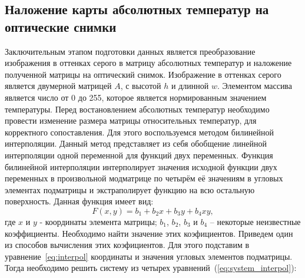 \documentclass[14pt, a4paper]{extreport}
\begin{document}
\subsection[\vspace*{-0.22cm}Наложение карты абсолютных температур на оптические \\ \hspace*{-1.15cm}снимки]{\vspace*{-0.22cm}Наложение карты абсолютных температур на \\ \hspace*{-3.75cm}оптические снимки}	
	Заключительным этапом подготовки данных является преобразование изображения в оттенках серого в матрицу абсолютных температур и наложение полученной матрицы на оптический снимок. Изображение в оттенках серого является двумерной матрицей $A$, с высотой $h$ и длинной $w$. Элементом массива является число от 0 до 255, которое является нормированным значением температуры.
	Перед востановлением абсолютных температур необходимо провести изменение размера матрицы относительных температур, для корректного сопоставления. Для этого воспользуемся методом билинейной интерполяции. Данный метод представляет из себя обобщение линейной интерполяции одной переменной для функций двух переменных. Функция билинейной интерполяции интерполирует значения исходной функции двух переменных в произвольной модматрице по четырём её значениям в угловых элементах подматрицы и экстраполирует функцию на всю остальную поверхность. Данная функция имеет вид: 
	\begin{equation}
		F(x,y)=b_{1}+b_{2} x+b_{3} y+b_{4} x y,
		\label{eq:interpol}
	\end{equation}
	где $x$ и $y$ - координаты элемента матрицы; $b_1$, $b_2$, $b_3$ и $b_4$ -- некоторые неизвестные коэффициенты. Необходимо найти значение этих коэфициентов. Приведем один из способов вычисления этих коэфициентов. Для этого подставим в уравнение~\ref{eq:interpol} координаты и значения угловых 
	элементов подматрицы. Тогда необходимо решить систему из четырех уравнений~(\ref{eq:system_interpol}):
	
\end{document}
